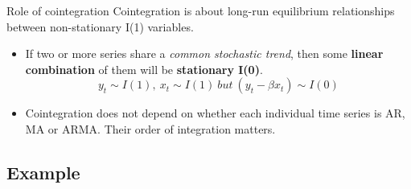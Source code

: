 \begin{frame}{Role of cointegration}
	Cointegration is about long-run equilibrium relationships between non-stationary I(1) variables.
	
	\begin{itemize}
		\item If two or more series share a \textit{common stochastic trend}, then some \textbf{linear combination} of them will be \textbf{stationary I(0)}.
		$$y_t \sim I(1),\ x_t \sim I(1)\ but\ (y_t - \beta x_t) \sim I(0)$$
		
		\item Cointegration does not depend on whether each individual time series is AR, MA or ARMA. Their order of integration matters.
	\end{itemize}
\end{frame}


\subsection{Example}

